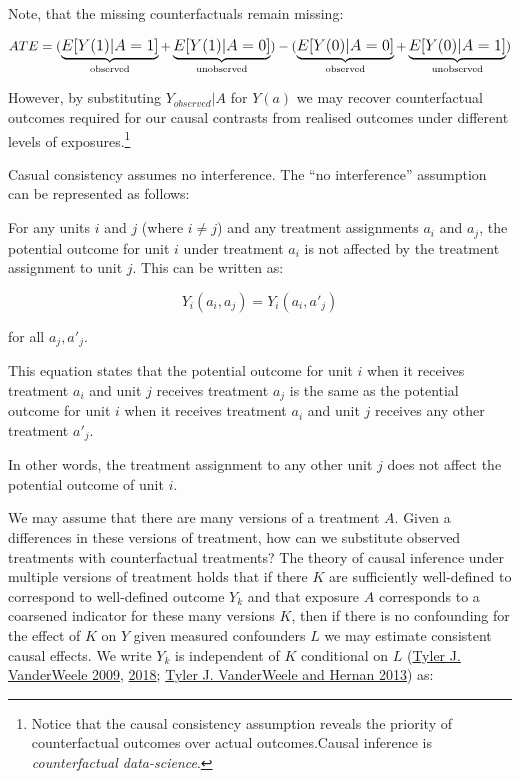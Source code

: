 \documentclass[
  singlecolumn]{report}
\begin{document}
Note, that the missing counterfactuals remain missing:

\[
ATE = \large(\underbrace{E[Y(1)|A = 1]}_\text{observed} + \underbrace{E[Y(1)|A = 0]}_\text{unobserved}\large) - \large(\underbrace{E[Y(0)|A = 0]}_\text{observed}  + \underbrace{E[Y(0)|A = 1]}_\text{unobserved}\large)
\]

However, by substituting \(Y_{observed}|A\) for \(Y(a)\) we may recover
counterfactual outcomes required for our causal contrasts from realised
outcomes under different levels of exposures.\footnote{Notice that the
  causal consistency assumption reveals the priority of counterfactual
  outcomes over actual outcomes.Causal inference is \emph{counterfactual
  data-science}.}

Casual consistency assumes no interference. The ``no interference''
assumption can be represented as follows:

For any units \(i\) and \(j\) (where \(i \neq j\)) and any treatment
assignments \(a_i\) and \(a_j\), the potential outcome for unit \(i\)
under treatment \(a_i\) is not affected by the treatment assignment to
unit \(j\). This can be written as:

\[Y_i(a_i, a_j) = Y_i(a_i, a'_j)\]

for all \(a_j, a'_j\).

This equation states that the potential outcome for unit \(i\) when it
receives treatment \(a_i\) and unit \(j\) receives treatment \(a_j\) is
the same as the potential outcome for unit \(i\) when it receives
treatment \(a_i\) and unit \(j\) receives any other treatment \(a'_j\).

In other words, the treatment assignment to any other unit \(j\) does
not affect the potential outcome of unit \(i\).

We may assume that there are many versions of a treatment \(A\). Given a
differences in these versions of treatment, how can we substitute
observed treatments with counterfactual treatments? The theory of causal
inference under multiple versions of treatment holds that if there \(K\)
are sufficiently well-defined to correspond to well-defined outcome
\(Y_k\) and that exposure \(A\) corresponds to a coarsened indicator for
these many versions \(K\), then if there is no confounding for the
effect of \(K\) on \(Y\) given measured confounders \(L\) we may
estimate consistent causal effects. We write \(Y_k\) is independent of
\(K\) conditional on \(L\)
(\protect\hyperlink{ref-vanderweele2009}{Tyler J. VanderWeele 2009},
\protect\hyperlink{ref-vanderweele2018}{2018};
\protect\hyperlink{ref-vanderweele2013}{Tyler J. VanderWeele and Hernan
2013}) as:
\end{document}
